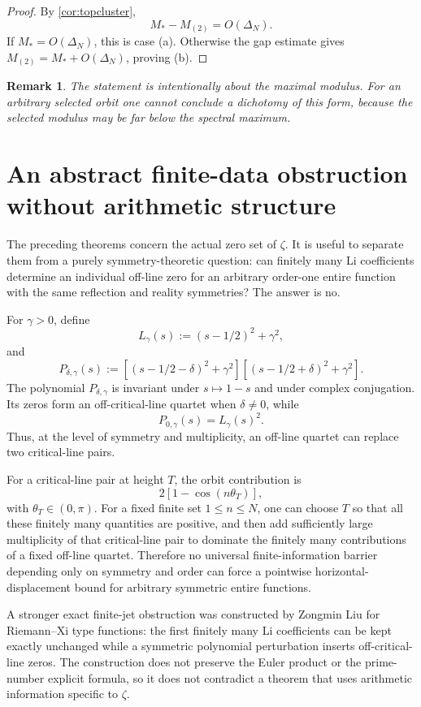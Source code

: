 \documentclass[11pt]{article}
\newtheorem{remark}[theorem]{Remark}
\newcommand{\zetaR}{\zeta}
\begin{document}
\begin{proof}
By \cref{cor:topcluster},
\[
M_*-M_{(2)}=O(\Delta_N).
\]
If \(M_*=O(\Delta_N)\), this is case (a). Otherwise the gap estimate gives \(M_{(2)}=M_*+O(\Delta_N)\), proving (b).
\end{proof}

\begin{remark}
The statement is intentionally about the maximal modulus. For an arbitrary selected orbit one cannot conclude a dichotomy of this form, because the selected modulus may be far below the spectral maximum.
\end{remark}

\section{An abstract finite-data obstruction without arithmetic structure}

The preceding theorems concern the actual zero set of \(\zetaR\). It is useful to separate them from a purely symmetry-theoretic question: can finitely many Li coefficients determine an individual off-line zero for an arbitrary order-one entire function with the same reflection and reality symmetries? The answer is no.

For \(\gamma>0\), define
\[
L_\gamma(s):=(s-1/2)^2+\gamma^2,
\]
and
\[
P_{\delta,\gamma}(s)
:=[(s-1/2-\delta)^2+\gamma^2]
[(s-1/2+\delta)^2+\gamma^2].
\]
The polynomial \(P_{\delta,\gamma}\) is invariant under \(s\mapsto1-s\) and under complex conjugation. Its zeros form an off-critical-line quartet when \(\delta\ne0\), while
\[
P_{0,\gamma}(s)=L_\gamma(s)^2.
\]
Thus, at the level of symmetry and multiplicity, an off-line quartet can replace two critical-line pairs.

For a critical-line pair at height \(T\), the orbit contribution is
\[
2[1-\cos(n\theta_T)],
\]
with \(\theta_T\in(0,\pi)\). For a fixed finite set \(1\le n\le N\), one can choose \(T\) so that all these finitely many quantities are positive, and then add sufficiently large multiplicity of that critical-line pair to dominate the finitely many contributions of a fixed off-line quartet. Therefore no universal finite-information barrier depending only on symmetry and order can force a pointwise horizontal-displacement bound for arbitrary symmetric entire functions.

A stronger exact finite-jet obstruction was constructed by Zongmin Liu for Riemann--Xi type functions: the first finitely many Li coefficients can be kept exactly unchanged while a symmetric polynomial perturbation inserts off-critical-line zeros. The construction does not preserve the Euler product or the prime-number explicit formula, so it does not contradict a theorem that uses arithmetic information specific to \(\zetaR\). \cite{Liu2026}
\end{document}
